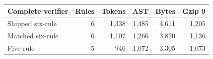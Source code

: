 \begin{center}\small
\begin{tabular}{lrrrrr}\toprule
Complete verifier & Rules & Tokens & AST & Bytes & Gzip 9\\\midrule
Shipped six-rule & 6 & 1,338 & 1,485 & 4,611 & 1,205\\
Matched six-rule & 6 & 1,107 & 1,266 & 3,820 & 1,136\\
Five-rule & 5 & 946 & 1,072 & 3,305 & 1,073\\
\bottomrule\end{tabular}
\end{center}
